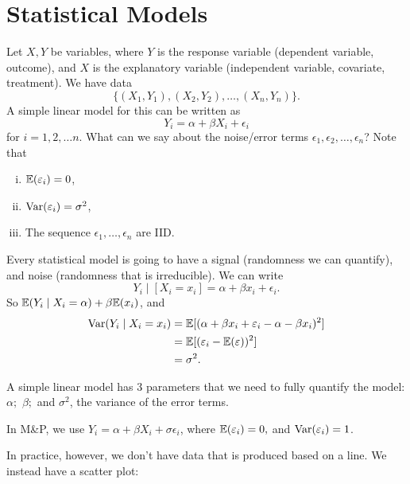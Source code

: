 \setcounter{chapter}{5}
\chapter{Statistical Models}

	Let $X,Y$ be variables, where $Y$ is the response variable (dependent variable, outcome), and $X$ is the explanatory variable (independent variable, covariate, treatment). We have data
	\[
		\{(X_1,Y_1),(X_2,Y_2),\ldots,(X_n,Y_n)\}
	.\] 
	A simple linear model for this can be written as \[
	Y_i=\alpha+\beta X_i +\epsilon_i
	\] for $i=1,2,\ldots n.$  What can we say about the noise/error terms $\epsilon_1,\epsilon_2,\ldots,\epsilon_n$? Note that

	\begin{enumerate}[(i)]
		\item $\mathbb E(\varepsilon_i)=0$,
		\item $\operatorname*{Var}(\varepsilon_i)=\sigma^2$,
		\item The sequence $\epsilon_1,\ldots,\epsilon_n$ are IID.
	\end{enumerate}

Every statistical model is going to have a signal (randomness we can quantify), and noise (randomness that is irreducible). We can write
\[
Y_i\mid [X_i = x_i] = \alpha +\beta x_i+\epsilon_i
.\] 
So $\mathbb E(Y_i\mid X_i=\alpha)+\beta\mathbb E(x_i)$, and
 \begin{align*}
		 \operatorname*{Var}(Y_i\mid X_i=x_i)&=\mathbb E[(\alpha+\beta x_i +\varepsilon_i-\alpha -\beta x_i)^2]\\
				     &=\mathbb E[(\varepsilon_i-\mathbb E(\varepsilon))^2] \\
					 &=\sigma^2
.\end{align*} 

A simple linear model has 3 parameters that we need to fully quantify the model: $\alpha;$ $\beta;$ and $ \sigma^2$, the variance of the error terms. 

\begin{remark}
	In M\&P, we use $Y_i=\alpha+\beta X_i+\sigma\epsilon_i$, where $\mathbb E(\varepsilon_i)=0,$ and $\operatorname*{Var}(\varepsilon_i)=1$.
\end{remark}


In practice, however, we don't have data that is produced based on a line. We instead have a scatter plot:

